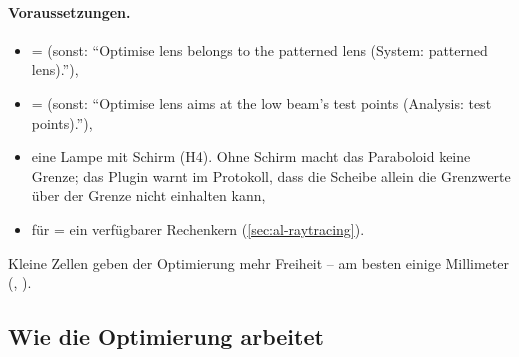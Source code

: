 \paragraph{Voraussetzungen.}
\begin{itemize}
  \item {} =  (sonst: \enquote{Optimise lens
    belongs to the patterned lens (System: patterned lens).}),
  \item {} =  (sonst: \enquote{Optimise lens aims at
    the low beam's test points (Analysis: test points).}),
  \item eine Lampe mit Schirm (H4). Ohne Schirm macht das Paraboloid keine Grenze; das Plugin warnt im
    Protokoll, dass die Scheibe allein die Grenzwerte über der Grenze nicht einhalten kann,
  \item für  =  ein verfügbarer Rechenkern
    (\autoref{sec:al-raytracing}).
\end{itemize}

Kleine Zellen geben der Optimierung mehr Freiheit -- am besten einige Millimeter (,
).

\subsection{Wie die Optimierung arbeitet}

